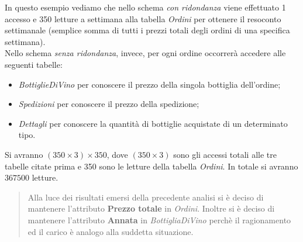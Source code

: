 \begin{flushleft}
In questo esempio vediamo che nello schema \emph{con ridondanza} viene effettuato 1 accesso e 350 letture a settimana alla tabella \emph{Ordini} per ottenere il resoconto settimanale (semplice somma di tutti i prezzi totali degli ordini di una specifica settimana).\\
\vspace{0.5cm}
Nello schema \emph{senza ridondanza}, invece, per ogni ordine occorrerà accedere alle seguenti tabelle:
\begin{itemize}
	\item \emph{BottiglieDiVino} per conoscere il prezzo della singola bottiglia dell'ordine;
	\item \emph{Spedizioni} per conoscere il prezzo della spedizione;
	\item \emph{Dettagli} per conoscere la quantità di bottiglie acquistate di un determinato tipo.
\end{itemize}
Si avranno $(350\times3)\times350$, dove $(350\times3)$ sono gli accessi totali alle tre tabelle citate prima e 350 sono le letture della tabella \emph{Ordini}. In totale si avranno $367500$ letture.\\
\begin{verse}
	Alla luce dei risultati emersi della precedente analisi si è deciso di mantenere l'attributo \textbf{Prezzo totale} in \emph{Ordini}. Inoltre si è deciso di mantenere l'attributo \textbf{Annata} in \emph{BottigliaDiVino} perchè il ragionamento ed il carico è analogo alla suddetta situazione.
\end{verse} 
\end{flushleft}
